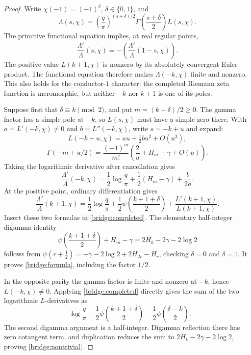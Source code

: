 \begin{proof}
Write $\chi(-1)=(-1)^\delta$, $\delta\in\{0,1\}$, and
\[
 \Lambda(s,\chi)=
 \left(\frac q\pi\right)^{(s+\delta)/2}
 \Gamma\left(\frac{s+\delta}{2}\right)L(s,\chi).
\]
The primitive functional equation \cite{DLMF25} implies, at real regular points,
\begin{equation}\label{bridge:completed}
 \frac{\Lambda'}{\Lambda}(s,\chi)
 =-\overline{\left(
       \frac{\Lambda'}{\Lambda}(1-s,\chi)\right)}.
\end{equation}
The positive value $L(k+1,\chi)$ is nonzero by its absolutely convergent
Euler product.  The functional equation therefore makes
$\Lambda(-k,\chi)$ finite and nonzero.  This also holds for the
conductor-$1$ character: the completed Riemann zeta function is
meromorphic, but neither $-k$ nor $k+1$ is one of its poles.

Suppose first that $\delta\equiv k\pmod2$, and put
$m=(k-\delta)/2\geq0$.  The gamma factor has a simple pole at $-k$,
so $L(s,\chi)$ must have a simple zero there.  With
$a=L'(-k,\chi)\ne0$ and $b=L''(-k,\chi)$, write $s=-k+u$ and expand:
\[
 L(-k+u,\chi)=a u+\tfrac12 b u^2+O(u^3),
\]
\[
 \Gamma(-m+u/2)=\frac{(-1)^m}{m!}
       \left(\frac2u+H_m-\gamma+O(u)\right).
\]
Taking the logarithmic derivative after cancellation gives
\begin{equation}\label{bridge:regularized-log}
 \frac{\Lambda'}{\Lambda}(-k,\chi)
 =\frac12\log\frac q\pi
  +\frac12(H_m-\gamma)+\frac{b}{2a}.
\end{equation}
At the positive point, ordinary differentiation gives
\[
 \frac{\Lambda'}{\Lambda}(k+1,\chi)
 =\frac12\log\frac q\pi
  +\frac12\psi\left(\frac{k+1+\delta}{2}\right)
  +\frac{L'(k+1,\chi)}{L(k+1,\chi)}.
\]
Insert these two formulas in \eqref{bridge:completed}.  The elementary
half-integer digamma identity \cite{DLMF5}
\[
 \psi\left(\frac{k+1+\delta}{2}\right)+H_m-\gamma
 =2H_k-2\gamma-2\log2
\]
follows from $\psi(r+\tfrac12)=-\gamma-2\log2+2H_{2r}-H_r$,
checking $\delta=0$ and $\delta=1$.  It proves
\eqref{bridge:formula}, including the factor $1/2$.

In the opposite parity the gamma factor is finite and nonzero at
$-k$, hence $L(-k,\chi)\ne0$.  Applying
\eqref{bridge:completed} directly gives the sum of the two logarithmic
$L$-derivatives as
\[
 -\log\frac q\pi
 -\frac12\psi\left(\frac{k+1+\delta}{2}\right)
 -\frac12\psi\left(\frac{\delta-k}{2}\right).
\]
The second digamma argument is a half-integer.  Digamma reflection
there has zero cotangent term, and duplication reduces the sum to
$2H_k-2\gamma-2\log2$, proving
\eqref{bridge:nontrivial}.
\end{proof}

